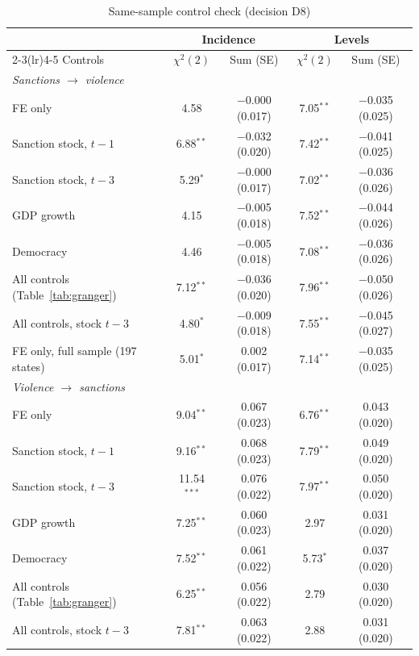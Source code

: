 \begin{table}[htbp]
\centering
\small
\caption{Same-sample control check (decision D8)}
\label{tab:controls}
\begin{threeparttable}
\begin{tabular}{lcccc}
\toprule
 & \multicolumn{2}{c}{Incidence} & \multicolumn{2}{c}{Levels} \\
\cmidrule(lr){2-3}\cmidrule(lr){4-5}
Controls & $\chi^2(2)$ & Sum (SE) & $\chi^2(2)$ & Sum (SE) \\
\midrule
\multicolumn{5}{l}{\textit{Sanctions $\rightarrow$ violence}} \\
\quad FE only & 4.58 & $-$0.000 (0.017) & 7.05$^{**}$ & $-$0.035 (0.025) \\
\quad Sanction stock, $t-1$ & 6.88$^{**}$ & $-$0.032 (0.020) & 7.42$^{**}$ & $-$0.041 (0.025) \\
\quad Sanction stock, $t-3$ & 5.29$^{*}$ & $-$0.000 (0.017) & 7.02$^{**}$ & $-$0.036 (0.026) \\
\quad GDP growth & 4.15 & $-$0.005 (0.018) & 7.52$^{**}$ & $-$0.044 (0.026) \\
\quad Democracy & 4.46 & $-$0.005 (0.018) & 7.08$^{**}$ & $-$0.036 (0.026) \\
\quad All controls (Table~\ref{tab:granger}) & 7.12$^{**}$ & $-$0.036 (0.020) & 7.96$^{**}$ & $-$0.050 (0.026) \\
\quad All controls, stock $t-3$ & 4.80$^{*}$ & $-$0.009 (0.018) & 7.55$^{**}$ & $-$0.045 (0.027) \\
\quad FE only, full sample (197 states) & 5.01$^{*}$ & 0.002 (0.017) & 7.14$^{**}$ & $-$0.035 (0.025) \\
\midrule
\multicolumn{5}{l}{\textit{Violence $\rightarrow$ sanctions}} \\
\quad FE only & 9.04$^{**}$ & 0.067 (0.023) & 6.76$^{**}$ & 0.043 (0.020) \\
\quad Sanction stock, $t-1$ & 9.16$^{**}$ & 0.068 (0.023) & 7.79$^{**}$ & 0.049 (0.020) \\
\quad Sanction stock, $t-3$ & 11.54$^{***}$ & 0.076 (0.022) & 7.97$^{**}$ & 0.050 (0.020) \\
\quad GDP growth & 7.25$^{**}$ & 0.060 (0.023) & 2.97 & 0.031 (0.020) \\
\quad Democracy & 7.52$^{**}$ & 0.061 (0.022) & 5.73$^{*}$ & 0.037 (0.020) \\
\quad All controls (Table~\ref{tab:granger}) & 6.25$^{**}$ & 0.056 (0.022) & 2.79 & 0.030 (0.020) \\
\quad All controls, stock $t-3$ & 7.81$^{**}$ & 0.063 (0.022) & 2.88 & 0.031 (0.020) \\

\end{tabular}
\end{threeparttable}
\end{table}
